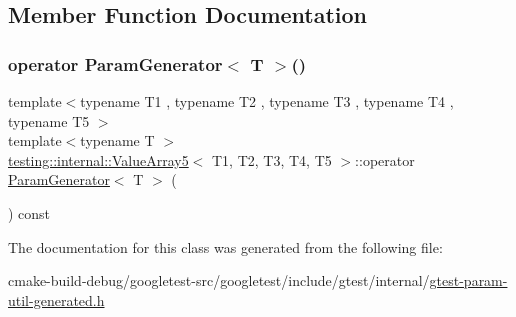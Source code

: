 \subsection{Member Function Documentation}
\mbox{\label{classtesting_1_1internal_1_1ValueArray5_ab925a168d89be9964c4319e5212222c1}} 
\subsubsection{\texorpdfstring{operator ParamGenerator$<$ T $>$()}{operator ParamGenerator< T >()}}
{\footnotesize\ttfamily template$<$typename T1 , typename T2 , typename T3 , typename T4 , typename T5 $>$ \\
template$<$typename T $>$ \\
\mbox{\hyperlink{classtesting_1_1internal_1_1ValueArray5}{testing\+::internal\+::\+Value\+Array5}}$<$ T1, T2, T3, T4, T5 $>$\+::operator \mbox{\hyperlink{classtesting_1_1internal_1_1ParamGenerator}{Param\+Generator}}$<$ T $>$ (\begin{DoxyParamCaption}{ }\end{DoxyParamCaption}) const\hspace{0.3cm}{\ttfamily [inline]}}



The documentation for this class was generated from the following file\+:\begin{DoxyCompactItemize}
\item 
cmake-\/build-\/debug/googletest-\/src/googletest/include/gtest/internal/\mbox{\hyperlink{gtest-param-util-generated_8h}{gtest-\/param-\/util-\/generated.\+h}}\end{DoxyCompactItemize}

